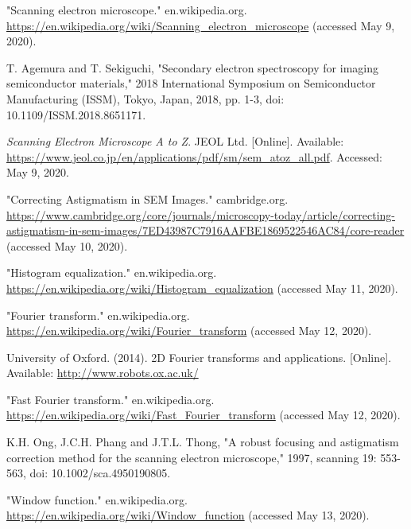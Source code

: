 \documentclass[conference]{IEEEtran}
\begin{document}
\begin{thebibliography}{00}
    "Scanning electron microscope." en.wikipedia.org. \url{https://en.wikipedia.org/wiki/Scanning_electron_microscope} (accessed May 9, 2020).

    T. Agemura and T. Sekiguchi, "Secondary electron spectroscopy for imaging semiconductor materials," 2018 International Symposium on Semiconductor Manufacturing (ISSM), Tokyo, Japan, 2018, pp. 1-3, doi: 10.1109/ISSM.2018.8651171.

    \textit{Scanning Electron Microscope A to Z}. JEOL Ltd. [Online]. Available: \url{https://www.jeol.co.jp/en/applications/pdf/sm/sem_atoz_all.pdf}. Accessed: May 9, 2020.

    "Correcting Astigmatism in SEM Images." cambridge.org. \url{https://www.cambridge.org/core/journals/microscopy-today/article/correcting-astigmatism-in-sem-images/7ED43987C7916AAFBE1869522546AC84/core-reader} (accessed May 10, 2020).

    "Histogram equalization." en.wikipedia.org. \url{https://en.wikipedia.org/wiki/Histogram_equalization} (accessed May 11, 2020).

    "Fourier transform." en.wikipedia.org. \url{https://en.wikipedia.org/wiki/Fourier_transform} (accessed May 12, 2020).

    University of Oxford. (2014). 2D Fourier transforms and applications. [Online]. Available: \url{http://www.robots.ox.ac.uk/}

    "Fast Fourier transform." en.wikipedia.org. \url{https://en.wikipedia.org/wiki/Fast_Fourier_transform} (accessed May 12, 2020).
    
    K.H. Ong, J.C.H. Phang and J.T.L. Thong, "A robust focusing and astigmatism correction method for the scanning electron microscope," 1997, scanning 19: 553-563, doi: 10.1002/sca.4950190805.

    "Window function." en.wikipedia.org. \url{https://en.wikipedia.org/wiki/Window_function} (accessed May 13, 2020).
\end{thebibliography}
\end{document}
